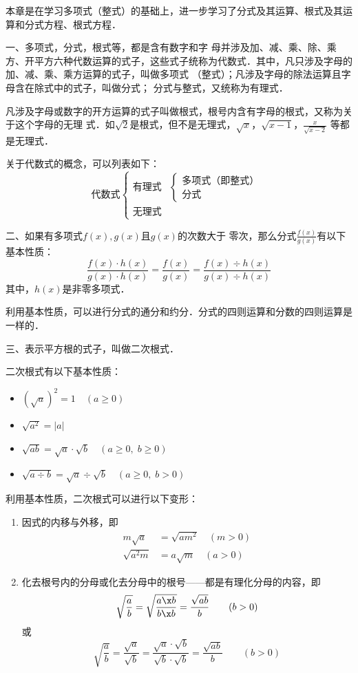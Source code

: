 本章是在学习多项式（整式）的基础上，进一步学习了分式及其运算、根式及其运算和分式方程、根式方程．

一、多项式，分式，根式等，都是含有数字和字
母并涉及加、减、乘、除、乘方、开平方六种代数运算的式子，这些式子统称为代数式．其中，凡只涉及字母的加、减、乘、乘方运算的式子，叫做多项式
（整式）；凡涉及字母的除法运算且字母含在除式中的式子，叫做分式；
分式与整式，又统称为有理式．

凡涉及字母或数字的开方运算的式子叫做根式，根号内含有字母的根式，又称为关于这个字母的无理
式．如$\sqrt{2}$是根式，但不是无理式，$\sqrt{x}$，$\sqrt{x-1}$，$\frac{x}{\sqrt{x-2}}$
等都是无理式．

关于代数式的概念，可以列表如下：
\[
\text{代数式}\begin{cases}
    \text{有理式} & \begin{cases}
        \text{多项式（即整式）}\\\text{分式}
    \end{cases}\\
    \text{无理式}
\end{cases}    
\]

二、如果有多项式$f(x),g(x)$且$g(x)$的次数大于
零次，那么分式$\frac{f (x)}{g (x)}$有以下基本性质：
\[\frac{f (x) \cdot h (x)}{g(x)\cdot h(x)}=\frac{f(x)}{g (x)}=\frac{f (x) \div h (x)}{g(x)\div h(x)}\]
其中，$h(x)$是非零多项式．

利用基本性质，可以进行分式的通分和约分．分式的四则运算和分数的四则运算是一样的．

三、表示平方根的式子，叫做二次根式．

二次根式有以下基本性质：
\begin{itemize}
    \item $\left(\sqrt{a}\right)^2=1\quad (a\ge 0)$
    \item $\sqrt{a^2}=|a|$
    \item $\sqrt{ab}=\sqrt{a}\cdot \sqrt{b}\quad (a\ge 0,\; b\ge 0)$
    \item $\sqrt{a\div b}=\sqrt{a}\div \sqrt{b} \quad (a\ge 0,\; b>0)$
\end{itemize}

利用基本性质，二次根式可以进行以下变形：
\begin{enumerate}
    \item 因式的内移与外移，即
    \[\begin{split}
        m\sqrt{a}&=\sqrt{am^2}\quad (m>0)\\
        \sqrt{a^2m}&=a\sqrt{m}\quad (a>0)
    \end{split}\]
    \item 化去根号内的分母或化去分母中的根号——都是有理化分母的内容，即
\[\sqrt{\frac{a}{b}}=\sqrt{\frac{a\x b}{b\x b}}=\frac{\sqrt{ab}}{b}\qquad (b>0)\]
或
\[\sqrt{\frac{a}{b}}=\frac{\sqrt{a}}{\sqrt{b}}=\frac{\sqrt{a}\cdot \sqrt{b}}{\sqrt{b}\cdot \sqrt{b}}=\frac{\sqrt{ab}}{b}\qquad (b>0)\]
\end{enumerate}

